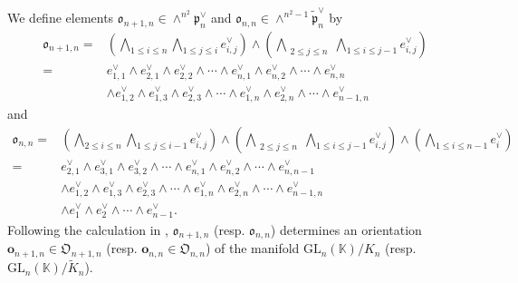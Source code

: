 \documentclass[12pt, a4paper]{amsart}
\newcommand{\GL}{{\mathrm{GL}}}
\newcommand{\K}{\mathbb{K}}
\theoremstyle{Theorem}
\theoremstyle{Theorem}
\theoremstyle{Theorem}
\theoremstyle{Theorem}
\theoremstyle{Plain}
\theoremstyle{Definition}
\begin{document}
	We define elements $\mathfrak{o}_{n+1,n}\in\wedge^{n^2}\mathfrak{p}_n^{\vee}$ and $\mathfrak{o}_{n,n}\in\wedge^{n^2-1}\widetilde{\mathfrak{p}}_n^{\vee}$ by
	\[
	\begin{aligned}
		\mathfrak{o}_{n+1,n}=&\left(\bigwedge_{1\leq i\leq n}\bigwedge_{1\leq j\leq i}e^{\vee}_{i,j}\right)\wedge\left(\bigwedge_{\substack{2\leq j\leq n}}\bigwedge_{1\leq i\leq j-1}e^{\vee}_{i,j}\right) \\
		=&e^{\vee}_{1,1}\wedge e^{\vee}_{2,1}\wedge e^{\vee}_{2,2}\wedge\cdots\wedge e^{\vee}_{n,1}\wedge e^{\vee}_{n,2}\wedge\cdots\wedge e^{\vee}_{n,n}\\
		&\wedge e^{\vee}_{1,2}\wedge e^{\vee}_{1,3}\wedge e^{\vee}_{2,3}\wedge\cdots\wedge e^{\vee}_{1,n}\wedge e^{\vee}_{2,n}\wedge\cdots\wedge e^{\vee}_{n-1,n}
	\end{aligned}
	\]
	and
	\[
	\begin{aligned}
		\mathfrak{o}_{n,n}=&\left(\bigwedge_{2\leq i\leq n}\bigwedge_{1\leq j\leq i-1}e^{\vee}_{i,j}\right)\wedge\left(\bigwedge_{\substack{2\leq j\leq n}}\bigwedge_{1\leq i\leq j-1}e^{\vee}_{i,j}\right)\wedge\left(\bigwedge_{1\leq i\leq n-1}e_{i}^{\vee}\right)\\
		=&e_{2,1}^{\vee}\wedge e_{3,1}^{\vee}\wedge e_{3,2}^{\vee}\wedge\cdots\wedge e_{n,1}^{\vee}\wedge e_{n,2}^{\vee}\wedge\cdots\wedge e_{n,n-1}^{\vee}\\
		&\wedge e^{\vee}_{1,2}\wedge e^{\vee}_{1,3}\wedge e^{\vee}_{2,3}\wedge\cdots\wedge e^{\vee}_{1,n}\wedge e^{\vee}_{2,n}\wedge\cdots\wedge e^{\vee}_{n-1,n}\\
		&\wedge e_{1}^{\vee}\wedge e_{2}^{\vee}\wedge\cdots\wedge e_{n-1}^{\vee}.
	\end{aligned}
	\]
	Following the calculation in \cite[Section 3.2]{HMN}, $\mathfrak{o}_{n+1,n}$ (resp. $\mathfrak{o}_{n,n}$) determines an orientation $\mathbf{o}_{n+1,n}\in\mathfrak{O}_{n+1,n}$ (resp. $\mathbf{o}_{n,n}\in\mathfrak{O}_{n,n}$) of the manifold $\GL_n(\K)/K_n$ (resp. $\GL_n(\K)/\widetilde{K}_n$). 
	
\end{document}
